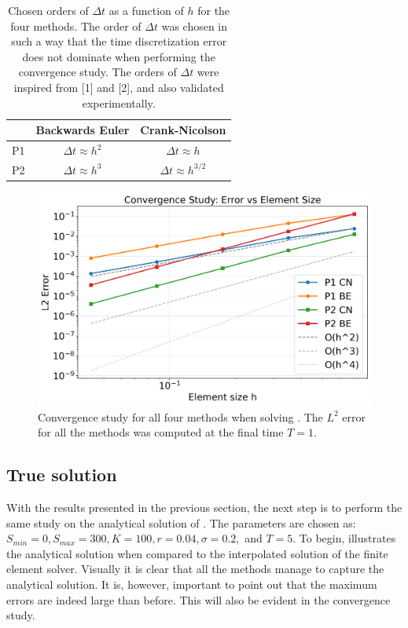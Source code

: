 \documentclass{article}
\begin{document}
\begin{table}[h!]
\centering
\begin{tabular}{|c|c|c|}
\hline
 & Backwards Euler & Crank-Nicolson \\
\hline
P1 & $\Delta t \approx h^2$ & $\Delta t \approx h$ \\
\hline
P2 & $\Delta t \approx h^3$ & $\Delta t \approx h^{3/2}$ \\
\hline
\end{tabular}
\caption{Chosen orders of $\Delta t$ as a function of $h$ for the four methods. The order of $\Delta t$ was chosen in such a way that the time discretization error does not dominate when performing the convergence study. The orders of $\Delta t$ were inspired from [1] and [2], and also validated experimentally.}
\label{tab:orders}
\end{table}




\begin{figure}[!ht]
    \centering
    \includegraphics[width=0.7\linewidth]{code/images/convergence_study_BlackScholesConstructedCos.png}
    \caption{Convergence study for all four methods when solving . The $L^2$ error for all the methods was computed at the final time $T = 1$.}
    \label{fig:conv_cos}
\end{figure}

\subsection{True solution}\label{sec:true_sol}
With the results presented in the previous section, the next step is to perform the same study on the analytical solution of . The parameters are chosen as: $S_{min}=0, S_{max}=300, K=100, r=0.04, \sigma =0.2, $ and $T = 5$. To begin,  illustrates the analytical solution when compared to the interpolated solution of the finite element solver. Visually it is clear that all the methods manage to capture the analytical solution. It is, however, important to point out that the maximum errors are indeed large than before. This will also be evident in the convergence study. 
\end{document}
